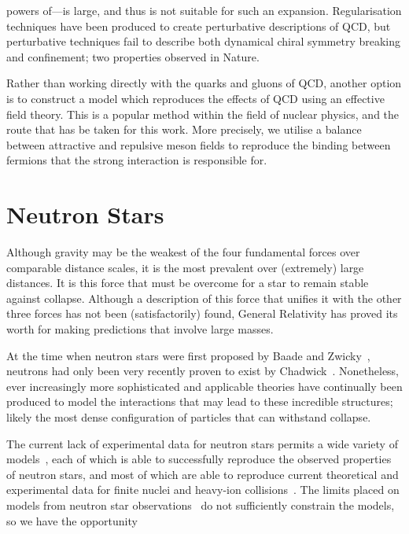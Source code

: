 \documentclass[11pt,a4paper,twoside]{carrollthesis}
\newcommand{\emdash}{\hspace{1pt}---\hspace{1pt}}
\begin{document}
powers of\emdash is large, and thus is not suitable for such an
expansion. Regularisation techniques have been produced to create
perturbative descriptions of QCD, but perturbative techniques fail to
describe both dynamical chiral symmetry breaking and confinement; two
properties observed in Nature.\par
%
Rather than working directly with the quarks and gluons of QCD,
another option is to construct a model which reproduces the effects of
QCD using an effective field theory. This is a popular method within
the field of nuclear physics, and the route that has be taken for this
work. More precisely, we utilise a balance between attractive and
repulsive meson fields to reproduce the binding between fermions that
the strong interaction is responsible for.
%
\section{Neutron Stars}\label{sec:neutronstarhistory}
%
Although gravity may be the weakest of the four fundamental forces
over comparable distance scales, it is the most prevalent over
(extremely) large distances. It is this force that must be overcome
for a star to remain stable against collapse. Although a description
of this force that unifies it with the other three forces has not been
(satisfactorily) found, General Relativity has proved its worth for
making predictions that involve large masses.\par
%
At the time when neutron stars were first proposed by Baade and
Zwicky~\cite{Baade:1934}, neutrons had only been very recently proven
to exist by Chadwick~\cite{Chadwick:1932ma}. Nonetheless, ever
increasingly more sophisticated and applicable theories have
continually been produced to model the interactions that may lead to
these incredible structures; likely the most dense configuration
of particles that can withstand collapse.\par
%
The current lack of experimental data for neutron stars permits a wide
variety of
models~\cite{Lattimer:2000nx,Heiselberg:1999mq,Weber:2004kj,SchaffnerBielich:2004ch,Weber:1989hr,Chin:1974sa},
each of which is able to successfully reproduce the observed
properties of neutron stars, and most of which are able to reproduce
current theoretical and experimental data for finite nuclei and
heavy-ion collisions~\cite{Danielewicz:2002pu,Worley:2008cb}. The
limits placed on models from neutron star
observations~\cite{Podsiadlowski:2005ig,Grigorian:2006pu,Klahn:2006iw}
do not sufficiently constrain the models, so we have the opportunity
\end{document}
